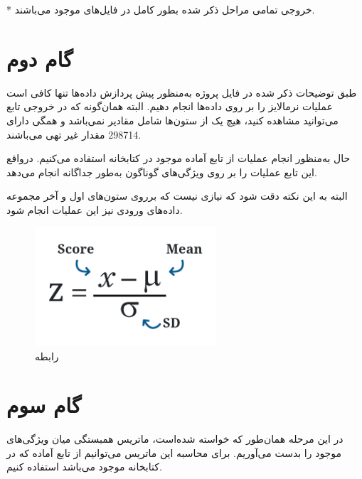\documentclass{article}
\begin{document}
* خروجی تمامی مراحل ذکر شده بطور کامل در فایل‌های  موجود می‌باشند.
\newpage
\section{گام دوم}
طبق توضیحات ذکر شده در فایل پروژه به‌منظور پیش پردازش داده‌ها تنها کافی است عملیات نرمالایز را بر روی داده‌ها انجام دهیم.
البته همان‌گونه که در خروجی تابع  می‌توانید مشاهده کنید، هیچ یک از ستون‌ها شامل مقادیر  نمی‌باشد و همگی دارای 298714 مقدار غیر تهی می‌باشند.

حال به‌منظور انجام عملیات  از تابع آماده  موجود در کتابخانه  استفاده می‌کنیم. درواقع این تابع عملیات  را بر روی ویژگی‌های گوناگون به‌طور جداگانه انجام می‌دهد.

البته به این نکته دقت شود که نیازی نیست که برروی ستون‌های اول و آخر مجموعه داده‌های ورودی نیز این عملیات انجام شود.
\begin{figure}[ht]
        \centering
        \includegraphics[width=0.6\textwidth]{Zscore_39.png}
        \caption{رابطه }
        \label{fig:fig3}
    \end{figure}
    
\newpage
\section{گام سوم}
در این مرحله همان‌طور که خواسته شده‌است، ماتریس همبستگی میان ویژگی‌های موجود را بدست می‌آوریم. برای محاسبه این ماتریس می‌توانیم از تابع آماده  که در کتابخانه  موجود می‌باشد استفاده کنیم.
\end{document}

